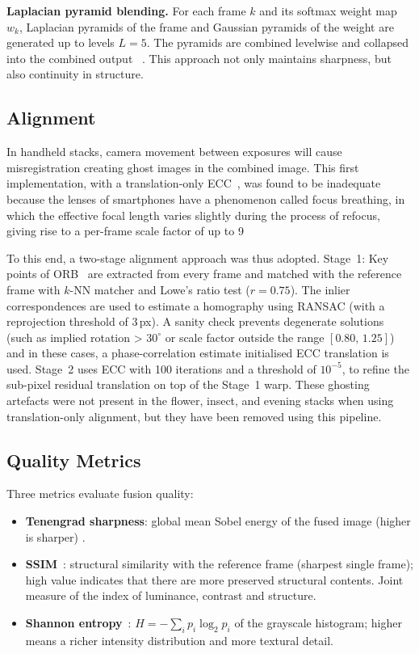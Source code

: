 \documentclass[conference]{IEEEtran}
\begin{document}
\textbf{Laplacian pyramid blending.}
For each frame $k$ and its softmax weight map $w_k$, Laplacian pyramids of the frame and Gaussian pyramids of the weight are generated up to levels $L=5$. The pyramids are combined levelwise and collapsed into the combined output ~\cite{burt1983multiresolution,zhang1999categorization}. This approach not only maintains sharpness, but also continuity in structure.
\subsection{Alignment}

In handheld stacks, camera movement between exposures will cause misregistration creating ghost images in the combined image. This first implementation, with a translation-only ECC~\cite{evangelidis2008parametric}, was found to be inadequate because the lenses of smartphones have a phenomenon called focus breathing, in which the effective focal length varies slightly during the process of refocus, giving rise to a per-frame scale factor of up to 9%

To this end, a two-stage alignment approach was thus adopted. Stage~1: Key points of ORB~\cite{rublee2011orb} are extracted from every frame and matched with the reference frame with $k$-NN matcher and Lowe's ratio test ($r=0.75$). The inlier correspondences are used to estimate a homography using RANSAC (with a reprojection threshold of 3\,px). A sanity check prevents degenerate solutions (such as implied rotation > $30^\circ$ or scale factor outside the range $[0.80,\,1.25]$) and in these cases, a phase-correlation estimate initialised ECC translation is used. Stage~2 uses ECC with 100 iterations and a threshold of $10^{-5}$, to refine the sub-pixel residual translation on top of the Stage~1 warp. These ghosting artefacts were not present in the flower, insect, and evening stacks when using translation-only alignment, but they have been removed using this pipeline.

\subsection{Quality Metrics}

Three metrics evaluate fusion quality:
\begin{itemize}
  \item \textbf{Tenengrad sharpness}: global mean Sobel energy of the fused image (higher is sharper) \cite{santos1997evaluation}.
 \item \textbf{SSIM}~\cite{wang2004ssim}: structural similarity with the reference frame (sharpest single frame); high value indicates that there are more preserved structural contents. Joint measure of the index of luminance, contrast and structure.
 \item \textbf{Shannon entropy}~\cite{shannon1948}: $H = -\sum_i p_i \log_2 p_i$ of the grayscale histogram; higher means a richer intensity distribution and more textural detail.
\end{itemize}
\end{document}

